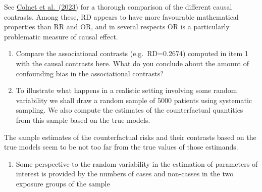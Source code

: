 \documentclass[
]{book}
\newenvironment{Shaded}{\begin{snugshade}}{\end{snugshade}}
\newcommand{\AttributeTok}[1]{\textcolor[rgb]{0.13,0.29,0.53}{#1}}
\newcommand{\DecValTok}[1]{\textcolor[rgb]{0.00,0.00,0.81}{#1}}
\newcommand{\FunctionTok}[1]{\textcolor[rgb]{0.13,0.29,0.53}{\textbf{#1}}}
\newcommand{\NormalTok}[1]{#1}
\newcommand{\OtherTok}[1]{\textcolor[rgb]{0.56,0.35,0.01}{#1}}
\newcommand{\SpecialCharTok}[1]{\textcolor[rgb]{0.81,0.36,0.00}{\textbf{#1}}}
\providecommand{\tightlist}{%
  \setlength{\itemsep}{0pt}\setlength{\parskip}{0pt}}
\begin{document}
See \href{https://doi.org/10.48550/arXiv.2303.16008}{Colnet et al.~(2023)}
for a thorough
comparison of the different causal contrasts. Among these,
RD appears to have more favourable mathematical properties
than RR and OR, and in several respects OR is a
particularly problematic measure of causal effect.

\begin{enumerate}
\def\labelenumi{\arabic{enumi}.}
\setcounter{enumi}{2}
\item
  Compare the associational contrasts (e.g.~RD=0.2674) computed in
  item 1 with the causal contrasts here. What do you conclude about
  the amount of confounding bias in the associational contrasts?
\item
  To illustrate what happens in a realistic setting involving some
  random variability we shall draw a random sample of 5000 patients
  using systematic sampling. We also compute the estimates of the
  counterfactual quantities from this sample based on the true models.
\end{enumerate}

\begin{Shaded}
\end{Shaded}

The sample estimates of the counterfactual risks and their contrasts
based on the true models seem to be not too far from the true values of
those estimands.

\begin{enumerate}
\def\labelenumi{\arabic{enumi}.}
\setcounter{enumi}{4}
\tightlist
\item
  Some perspective to the random variability in the estimation of
  parameters of interest is provided by the numbers of cases and
  non-casses in the two exposure groups of the sample
\end{enumerate}
\end{document}
